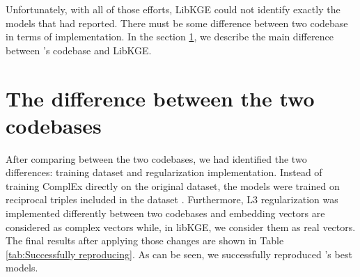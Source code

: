 Unfortunately, with all of those efforts, LibKGE could not identify exactly the models that \citet{chen2021relation} had reported. There must be some difference between two codebase in terms of implementation. In the section \ref{sec:The difference between the two codebases}, we describe the main difference between \cite{chen2021relation}'s codebase and LibKGE.



\section{The difference between the two codebases}
\label{sec:The difference between the two codebases}
After comparing between the two codebases, we had identified the two differences: training dataset and regularization implementation. Instead of training ComplEx directly on the original dataset, the models were trained on reciprocal triples included in the dataset \citep{chen2021relation}. Furthermore, L3 regularization was implemented differently between two codebases and embedding vectors are considered as complex vectors while, in libKGE, we consider them as real vectors. The final results after applying those changes are shown in Table \ref{tab:Successfully reproducing}. As can be seen, we successfully reproduced \citet{chen2021relation}'s best models.

